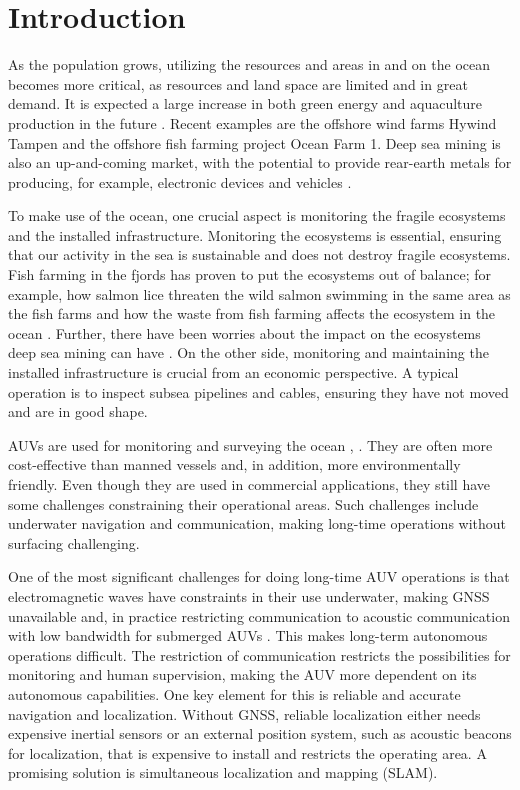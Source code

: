 \chapter{Introduction}

As the population grows, utilizing the resources and areas in and on the ocean becomes more critical, as resources and land space are limited and in great demand. It is expected a large increase in both green energy and aquaculture production in the future \cite{Oceans2050}. Recent examples are the offshore wind farms Hywind Tampen \cite{HywindEquinor} and the offshore fish farming project Ocean Farm 1\cite{HavbasertASA}. Deep sea mining is also an up-and-coming market, with the potential to provide rear-earth metals for producing, for example, electronic devices and vehicles \cite{Bogue2015UnderwaterApplications}.

To make use of the ocean, one crucial aspect is monitoring the fragile ecosystems and the installed infrastructure. Monitoring the ecosystems is essential, ensuring that our activity in the sea is sustainable and does not destroy fragile ecosystems. Fish farming in the fjords has proven to put the ecosystems out of balance; for example, how salmon lice threaten the wild salmon swimming in the same area as the fish farms and how the waste from fish farming affects the ecosystem in the ocean \cite{Fiskeoppdrett}. Further, there have been worries about the impact on the ecosystems deep sea mining can have \cite{UnderstandingTechnology}. On the other side, monitoring and maintaining the installed infrastructure is crucial from an economic perspective. A typical operation is to inspect subsea pipelines and cables, ensuring they have not moved and are in good shape. 

AUVs are used for monitoring and surveying the ocean \cite{Nicholson2008TheTechnologies}, \cite{HaugstadDenManeder}. They are often more cost-effective than manned vessels and, in addition, more environmentally friendly. Even though they are used in commercial applications, they still have some challenges constraining their operational areas. Such challenges include underwater navigation and communication, making long-time operations without surfacing challenging. 

One of the most significant challenges for doing long-time AUV operations is that electromagnetic waves have constraints in their use underwater, making GNSS unavailable and, in practice restricting communication to acoustic communication with low bandwidth for submerged AUVs \cite{Nicholson2008TheTechnologies}. This makes long-term autonomous operations difficult. The restriction of communication restricts the possibilities for monitoring and human supervision, making the AUV more dependent on its autonomous capabilities. One key element for this is reliable and accurate navigation and localization. Without GNSS, reliable localization either needs expensive inertial sensors or an external position system, such as acoustic beacons for localization, that is expensive to install and restricts the operating area. A promising solution is simultaneous localization and mapping (SLAM).

